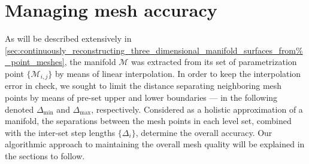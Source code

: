 \section{Managing mesh accuracy}
\label{sec:managing_mesh_accuracy}

As will be described extensively in
\cref{sec:continuously_reconstructing_three_dimensional_manifold_surfaces_from%
_point_meshes},
the manifold $\mathcal{M}$ was extracted from its set of parametrization
point $\{\mathcal{M}_{i,j}\}$ by means of linear interpolation. In order to
keep the interpolation error in check, we sought to limit the distance
separating neighboring mesh points by means of pre-set upper and lower
boundaries --- in the following denoted $\Delta_{\min}$ and $\Delta_{\max}$,
respectively. Considered as a holistic approximation of a manifold, the
separations between the mesh points in each level set, combined with the
inter-set step lengths $\{\Delta_{i}\}$, determine the overall accuracy. Our
algorithmic approach to maintaining the overall mesh quality will be explained
in the sections to follow.






